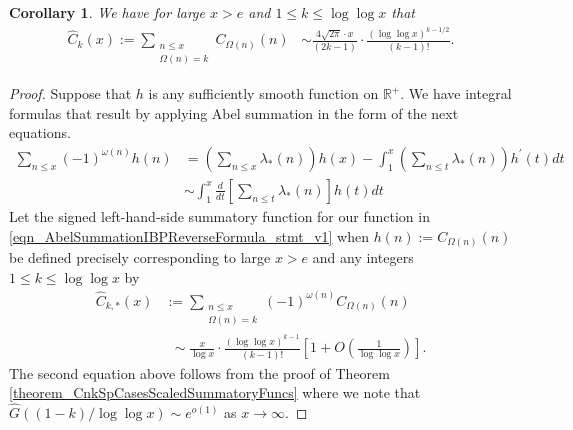 \documentclass[11pt,reqno,a4letter]{article}
\numberwithin{figure}{section}
\numberwithin{table}{section}
\theoremstyle{plain}
\newtheorem{cor}[theorem]{Corollary}
\numberwithin{theorem}{section}
\theoremstyle{definition}
\begin{document}
\begin{cor} 
\label{cor_SummatoryFuncsOfUnsignedSeqs_v2} 
We have for large $x > e$ and $1 \leq k \leq \log\log x$ that  
\begin{align*} 
\widehat{C}_k(x) := 
     \sum_{\substack{n \leq x \\ \Omega(n) = k}} C_{\Omega(n)}(n) & \sim 
     \frac{4\sqrt{2\pi} \cdot x}{(2k-1)} \cdot \frac{(\log\log x)^{k-1/2}}{(k-1)!}. 
\end{align*} 
\end{cor} 
\begin{proof} 
Suppose that $h$ is any sufficiently smooth function on $\mathbb{R}^{+}$. 
We have integral formulas that result by 
applying Abel summation in the form of the next equations. 
\begin{subequations}
\begin{align} 
\label{eqn_AbelSummationIBPReverseFormula_stmt_v1} 
\sum_{n \leq x} (-1)^{\omega(n)} h(n) & = \left(\sum_{n \leq x} \lambda_{\ast}(n)\right) h(x) - 
     \int_{1}^{x} \left(\sum_{n \leq t} \lambda_{\ast}(n)\right) h^{\prime}(t) dt \\ 
\label{eqn_AbelSummationIBPReverseFormula_stmt_v2}
     & \sim 
     \int_1^{x} \frac{d}{dt}\left[\sum_{n \leq t} \lambda_{\ast}(n)\right] h(t) dt
\end{align} 
\end{subequations}
Let the signed left-hand-side summatory function for our function 
in \eqref{eqn_AbelSummationIBPReverseFormula_stmt_v1} when $h(n) := C_{\Omega(n)}(n)$ be defined precisely 
corresponding to large $x > e$ and any integers $1 \leq k \leq \log\log x$ by 
\begin{align*} 
\widehat{C}_{k,\ast}(x) & := \sum_{\substack{n \leq x \\ \Omega(n)=k}} 
     (-1)^{\omega(n)} C_{\Omega(n)}(n) \\ 
     & \phantom{:} \sim 
     \frac{x}{\log x} \cdot \frac{(\log\log x)^{k-1}}{(k-1)!} \left[ 
     1 + O\left(\frac{1}{\log\log x}\right)\right].
\end{align*} 
The second equation above follows from the proof of 
Theorem \ref{theorem_CnkSpCasesScaledSummatoryFuncs} where 
we note that $\widehat{G}((1-k)/\log\log x) \sim e^{o(1)}$ as 
$x \rightarrow \infty$. 


\end{proof}
\end{document}
